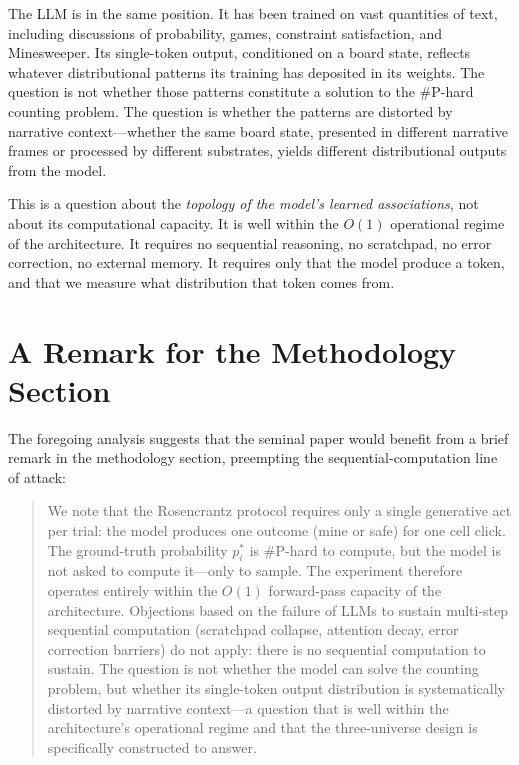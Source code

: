 \documentclass[12pt,a4paper]{article}
\begin{document}
The LLM is in the same position. It has been trained on vast quantities of text, including discussions of probability, games, constraint satisfaction, and Minesweeper. Its single-token output, conditioned on a board state, reflects whatever distributional patterns its training has deposited in its weights. The question is not whether those patterns constitute a solution to the \#P-hard counting problem. The question is whether the patterns are distorted by narrative context---whether the same board state, presented in different narrative frames or processed by different substrates, yields different distributional outputs from the model.

This is a question about the \emph{topology of the model's learned associations}, not about its computational capacity. It is well within the $O(1)$ operational regime of the architecture. It requires no sequential reasoning, no scratchpad, no error correction, no external memory. It requires only that the model produce a token, and that we measure what distribution that token comes from.

\section{A Remark for the Methodology Section}

The foregoing analysis suggests that the seminal paper \citep{baldo2026_v3} would benefit from a brief remark in the methodology section, preempting the sequential-computation line of attack:

\begin{quote}
We note that the Rosencrantz protocol requires only a single generative act per trial: the model produces one outcome (mine or safe) for one cell click. The ground-truth probability $p_i^*$ is \#P-hard to compute, but the model is not asked to compute it---only to sample. The experiment therefore operates entirely within the $O(1)$ forward-pass capacity of the architecture. Objections based on the failure of LLMs to sustain multi-step sequential computation (scratchpad collapse, attention decay, error correction barriers) do not apply: there is no sequential computation to sustain. The question is not whether the model can solve the counting problem, but whether its single-token output distribution is systematically distorted by narrative context---a question that is well within the architecture's operational regime and that the three-universe design is specifically constructed to answer.
\end{quote}
\end{document}
